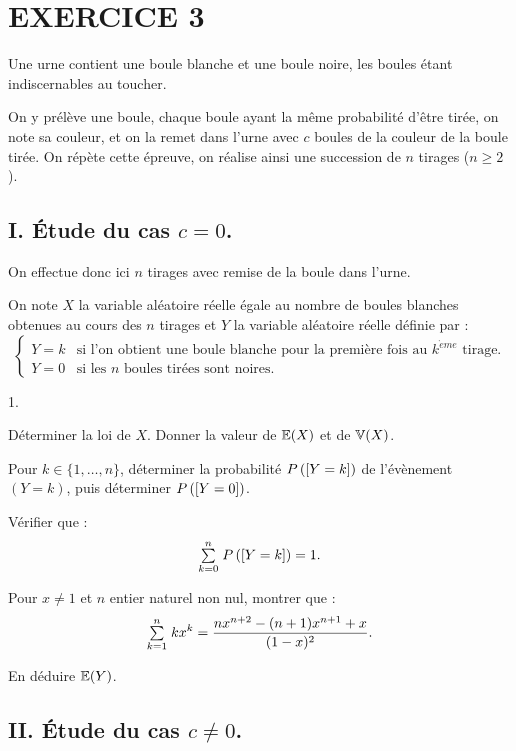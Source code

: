 \documentclass[11pt]{article}%
\begin{document}
\section*{EXERCICE 3}

Une urne contient une boule blanche et une boule noire, les boules
étant
indiscernables au toucher.

On y prélève une boule, chaque boule ayant la même probabilité d'être
tirée,
on note sa couleur, et on la remet dans l'urne avec $c$ boules de la
couleur
de la boule tirée. On répète cette épreuve, on réalise ainsi une
succession
de $n$ tirages ($n\geq 2$).

\subsection*{I. Étude du cas $c = 0$.}

On effectue donc ici $n$ tirages avec remise de la boule dans l'urne.

On note $X$ la variable aléatoire réelle égale au nombre de boules
blanches
obtenues au cours des $n$ tirages et $Y$ la variable aléatoire réelle
définie par : 
\[
\left\{
\begin{array}{cl}
Y = k & \text{si l'on obtient une boule blanche pour la première fois
au }k^{\grave{e}me}\text{ tirage.} \\
Y = 0 & \text{si les $n$ boules tirées sont noires.}
\end{array}
\right.
\]

\begin{noliste}{1.}
 \setlength{\itemsep}{4mm}
\item Déterminer la loi de $X$. Donner la valeur de $\mathbb{E}(X)$ et de
$\mathbb{V}(X)$.

\item Pour $k\in \{1,\ldots,n\}$, déterminer la probabilité
$P\left(\left[ {Y = k} \right]\right)$ de l'évènement $(Y = k)$, puis déterminer
$P\left(\left[ {Y = 0} \right]\right)$.

\item Vérifier que : 
\[
{\textstyle\sum\limits_{k = 0}^{n}}\hspace{.1cm}P\left(\left[ {Y = k} \right]\right) = 1.
\]

\item Pour $x\neq 1$ et $n$ entier naturel non nul, montrer que : 
\[
{\textstyle\sum\limits_{k = 1}^{n}}\hspace{.1cm}kx^{k} = \dfrac{nx^{n + 2}-(n + 1)x^{n + 1} +
x}{(1-x)^{2}}.
\]

\item En déduire $\mathbb{E}(Y)$.
\end{noliste}

\subsection*{II. Étude du cas $c\neq 0$.}
\end{document}
